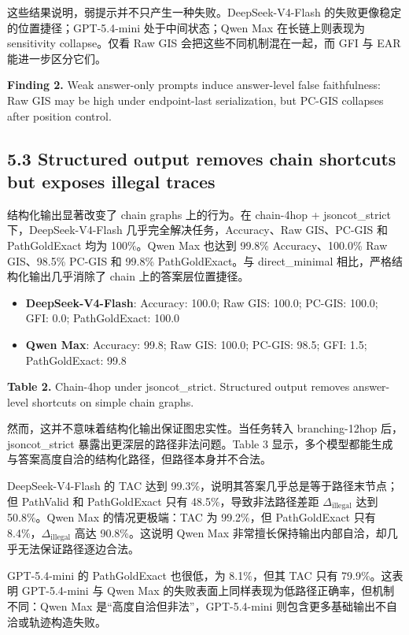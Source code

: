 \documentclass[
  11pt,
]{article}
\providecommand{\tightlist}{%
  \setlength{\itemsep}{0pt}\setlength{\parskip}{0pt}}
\begin{document}
这些结果说明，弱提示并不只产生一种失败。DeepSeek-V4-Flash
的失败更像稳定的位置捷径；GPT-5.4-mini 处于中间状态；Qwen Max
在长链上则表现为 sensitivity collapse。仅看 Raw GIS
会把这些不同机制混在一起，而 GFI 与 EAR 能进一步区分它们。

\textbf{Finding 2.} Weak answer-only prompts induce answer-level false
faithfulness: Raw GIS may be high under endpoint-last serialization, but
PC-GIS collapses after position control.

\subsection{5.3 Structured output removes chain shortcuts but exposes
illegal
traces}\label{structured-output-removes-chain-shortcuts-but-exposes-illegal-traces}

结构化输出显著改变了 chain graphs 上的行为。在 chain-4hop +
jsoncot\_strict 下，DeepSeek-V4-Flash 几乎完全解决任务，Accuracy、Raw
GIS、PC-GIS 和 PathGoldExact 均为 100\%。Qwen Max 也达到 99.8\%
Accuracy、100.0\% Raw GIS、98.5\% PC-GIS 和 99.8\% PathGoldExact。与
direct\_minimal 相比，严格结构化输出几乎消除了 chain
上的答案层位置捷径。

\begin{itemize}
\tightlist
\item
  \textbf{DeepSeek-V4-Flash}: Accuracy: 100.0; Raw GIS: 100.0; PC-GIS:
  100.0; GFI: 0.0; PathGoldExact: 100.0
\item
  \textbf{Qwen Max}: Accuracy: 99.8; Raw GIS: 100.0; PC-GIS: 98.5; GFI:
  1.5; PathGoldExact: 99.8
\end{itemize}

\textbf{Table 2.} Chain-4hop under jsoncot\_strict. Structured output
removes answer-level shortcuts on simple chain graphs.

然而，这并不意味着结构化输出保证图忠实性。当任务转入 branching-12hop
后，jsoncot\_strict 暴露出更深层的路径非法问题。Table 3
显示，多个模型都能生成与答案高度自洽的结构化路径，但路径本身并不合法。

DeepSeek-V4-Flash 的 TAC 达到
99.3\%，说明其答案几乎总是等于路径末节点；但 PathValid 和 PathGoldExact
只有 48.5\%，导致非法路径差距 \(\Delta_{\text{illegal}}\) 达到
50.8\%。Qwen Max 的情况更极端：TAC 为 99.2\%，但 PathGoldExact 只有
8.4\%，\(\Delta_{\text{illegal}}\) 高达 90.8\%。这说明 Qwen Max
非常擅长保持输出内部自洽，却几乎无法保证路径逐边合法。

GPT-5.4-mini 的 PathGoldExact 也很低，为 8.1\%，但其 TAC 只有
79.9\%。这表明 GPT-5.4-mini 与 Qwen Max
的失败表面上同样表现为低路径正确率，但机制不同：Qwen Max
是``高度自洽但非法''，GPT-5.4-mini
则包含更多基础输出不自洽或轨迹构造失败。
\end{document}

